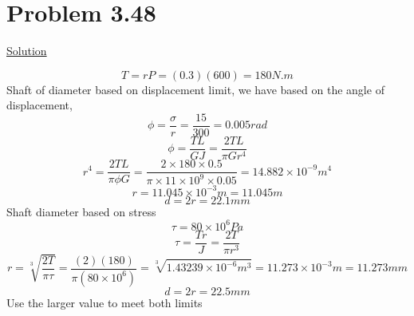 \documentclass{article}
\begin{document}
\section*{Problem 3.48}


\begin{center}\underline{Solution}\end{center}
\[T = rP = (0.3)(600) = 180N.m\]
Shaft of diameter based on displacement limit, we have based on the angle of displacement,
\[\phi = \frac{\sigma}{r} = \frac{15}{300} = 0.005 rad\]
\[\phi = \frac{TL}{GJ} = \frac{2TL}{\pi Gr^{4}}\]
\[r^{4} = \frac{2TL}{\pi\phi G} = \frac{2\times180\times0.5}{\pi\times11\times10^{9}\times0.05} = 14.882\times10^{-9}m^{4}\]
\[r = 11.045\times10^{-3}m = 11.045m\]
\[d  =2r = 22.1mm\]
Shaft diameter based on stress 
\[\tau = 80\times10^{6}Pa\]
\[\tau =\frac{Tr}{J}=\frac{2T}{\pi r^{3}}\]
\[r = \sqrt[3]{\frac{2T}{\pi\tau} }= \frac{(2)(180)}{\pi(80\times10^{6})} = \sqrt[3]{1.43239\times10^{-6}m^{3}} = 11.273\times10^{-3}m = 11.273mm\]
\[d = 2r = 22.5mm\]
Use the larger value to meet both limits
\end{document}
